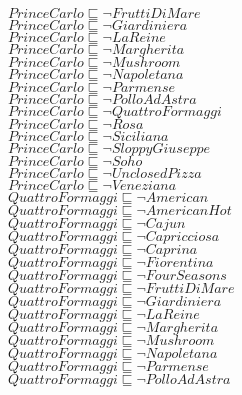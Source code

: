 \documentclass[a4paper,10pt]{article}
\begin{document}
 $PrinceCarlo \sqsubseteq  \lnot FruttiDiMare$\\ 
 $PrinceCarlo \sqsubseteq  \lnot Giardiniera$\\ 
 $PrinceCarlo \sqsubseteq  \lnot LaReine$\\ 
 $PrinceCarlo \sqsubseteq  \lnot Margherita$\\ 
 $PrinceCarlo \sqsubseteq  \lnot Mushroom$\\ 
 $PrinceCarlo \sqsubseteq  \lnot Napoletana$\\ 
 $PrinceCarlo \sqsubseteq  \lnot Parmense$\\ 
 $PrinceCarlo \sqsubseteq  \lnot PolloAdAstra$\\ 
 $PrinceCarlo \sqsubseteq  \lnot QuattroFormaggi$\\ 
 $PrinceCarlo \sqsubseteq  \lnot Rosa$\\ 
 $PrinceCarlo \sqsubseteq  \lnot Siciliana$\\ 
 $PrinceCarlo \sqsubseteq  \lnot SloppyGiuseppe$\\ 
 $PrinceCarlo \sqsubseteq  \lnot Soho$\\ 
 $PrinceCarlo \sqsubseteq  \lnot UnclosedPizza$\\ 
 $PrinceCarlo \sqsubseteq  \lnot Veneziana$\\ 
 $QuattroFormaggi \sqsubseteq  \lnot American$\\ 
 $QuattroFormaggi \sqsubseteq  \lnot AmericanHot$\\ 
 $QuattroFormaggi \sqsubseteq  \lnot Cajun$\\ 
 $QuattroFormaggi \sqsubseteq  \lnot Capricciosa$\\ 
 $QuattroFormaggi \sqsubseteq  \lnot Caprina$\\ 
 $QuattroFormaggi \sqsubseteq  \lnot Fiorentina$\\ 
 $QuattroFormaggi \sqsubseteq  \lnot FourSeasons$\\ 
 $QuattroFormaggi \sqsubseteq  \lnot FruttiDiMare$\\ 
 $QuattroFormaggi \sqsubseteq  \lnot Giardiniera$\\ 
 $QuattroFormaggi \sqsubseteq  \lnot LaReine$\\ 
 $QuattroFormaggi \sqsubseteq  \lnot Margherita$\\ 
 $QuattroFormaggi \sqsubseteq  \lnot Mushroom$\\ 
 $QuattroFormaggi \sqsubseteq  \lnot Napoletana$\\ 
 $QuattroFormaggi \sqsubseteq  \lnot Parmense$\\ 
 $QuattroFormaggi \sqsubseteq  \lnot PolloAdAstra$\\ 
\end{document}
